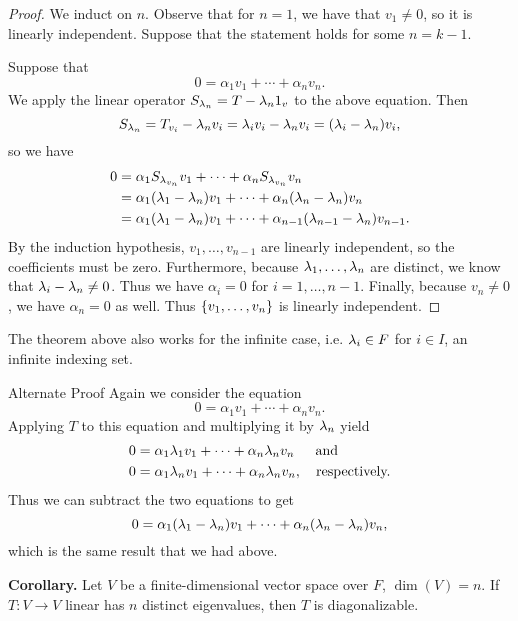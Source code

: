 \documentclass[class=article, crop=false]{standalone}
\begin{document}
  \begin{proof}
    We induct on $n$. Observe that for $n=1$, we have that $v_1\neq 0$, so it is linearly independent. Suppose that the statement holds for some $n = k-1$. \par
    Suppose that
    \[
      0 = \alpha_1v_1 + \dotsb + \alpha_nv_n. \tag{$\alpha_1,\dotsc,\alpha_n\in F$}
    \]
    We apply the linear operator $S_{\lambda_n} = T - \lambda_n1_v$ to the above equation. Then
    \[
      S_{\lambda_n} = T_{v_i} - \lambda_nv_i = \lambda_iv_i - \lambda_nv_i = (\lambda_i - \lambda_n)v_i,
    \]
    so we have
    \begin{align*}
      0 &= \alpha_1S_{\lambda_{v_n}}v_1 + \dotsb + \alpha_nS_{\lambda_{v_n}}v_n \\
        &= \alpha_1(\lambda_1-\lambda_n)v_1 + \dotsb + \alpha_n(\lambda_n-\lambda_n)v_n \\
        &= \alpha_1(\lambda_1-\lambda_n)v_1 + \dotsb + \alpha_{n-1}(\lambda_{n-1}-\lambda_n)v_{n-1}.
    \end{align*}
    By the induction hypothesis, $v_1,\dotsc,v_{n-1}$ are linearly independent, so the coefficients must be zero. Furthermore, because $\lambda_1,\dotsc,\lambda_n$ are distinct, we know that $\lambda_i-\lambda_n\neq 0$. Thus we have $\alpha_i = 0$ for $i = 1,\dotsc,n-1$. Finally, because $v_n\neq 0$, we have $\alpha_n = 0$ as well. Thus $\left\{v_1,\dotsc,v_n\right\}$ is linearly independent.
  \end{proof}
  \begin{note}{}
    The theorem above also works for the infinite case, i.e. $\lambda_i\in F$ for $i\in I$, an infinite indexing set.
  \end{note}
  \begin{note}{Alternate Proof}
    Again we consider the equation 
    \[
      0 = \alpha_1v_1 + \dotsb + \alpha_nv_n. \tag{$\alpha_1,\dotsc,\alpha_n\in F$}
    \]
    Applying $T$ to this equation and multiplying it by $\lambda_n$ yield
    \begin{align*}
      0 &= \alpha_1\lambda_1v_1 + \dotsb + \alpha_n\lambda_nv_n\,\,\, \quad\text{and} \\
      0 &= \alpha_1\lambda_nv_1 + \dotsb + \alpha_n\lambda_nv_n, \quad\text{respectively.}
    \end{align*}
    Thus we can subtract the two equations to get
    \[
      0 = \alpha_1(\lambda_1 - \lambda_n)v_1 + \dotsb + \alpha_n(\lambda_n - \lambda_n)v_n,
    \]
    which is the same result that we had above.
  \end{note}
  \textbf{Corollary.} Let $V$ be a finite-dimensional vector space over $F$, $\dim(V)= n$. If $T\colon V\to V$ linear has $n$ distinct eigenvalues, then $T$ is diagonalizable.
\end{document}

